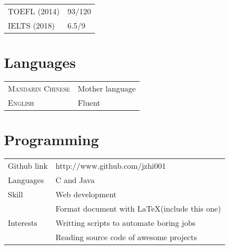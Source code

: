 \documentclass[11pt,a4paper]{article}
\begin{document}
\noindent\begin{tabular}{p{7cm} l}
	TOEFL (2014) & 93/120\\
	IELTS (2018) & 6.5/9\\
\end{tabular}

\section{Languages}
	\noindent\begin{tabular}{p{7cm} l}
	\textsc{Mandarin Chinese} & Mother language\\
	\textsc{English} & Fluent\\
\end{tabular}

\section{Programming}\noindent
\begin{tabular}{p{6cm} l}
	Github link
		& http://www.github.com/jzhi001\\ 
	Languages 
		& C and Java\\
	Skill 
		& Web development\\
		& Format document with \LaTeX (include this one)\\
	Interests 
		& Writting scripts to automate boring jobs\\
		& Reading source code of awesome projects
\end{tabular}
\end{document}
